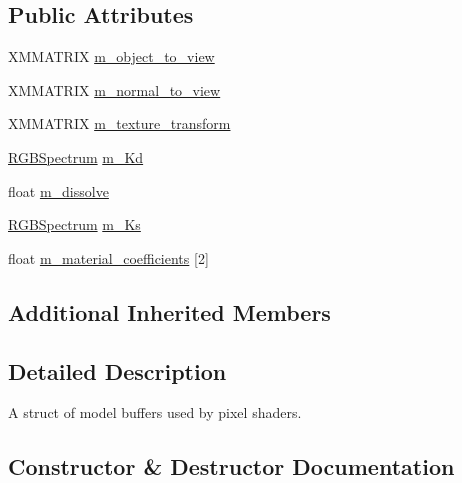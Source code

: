 \subsection*{Public Attributes}
\begin{DoxyCompactItemize}
\item 
X\+M\+M\+A\+T\+R\+IX \hyperlink{structmage_1_1_model_buffer_a2b4b94cd38c5d276aea4a7d6cc9edbba}{m\+\_\+object\+\_\+to\+\_\+view}
\item 
X\+M\+M\+A\+T\+R\+IX \hyperlink{structmage_1_1_model_buffer_ae9cfca57417c88d28362d979d6d37fa8}{m\+\_\+normal\+\_\+to\+\_\+view}
\item 
X\+M\+M\+A\+T\+R\+IX \hyperlink{structmage_1_1_model_buffer_a22d0996efc06c121ce2e0b88235d5650}{m\+\_\+texture\+\_\+transform}
\item 
\hyperlink{structmage_1_1_r_g_b_spectrum}{R\+G\+B\+Spectrum} \hyperlink{structmage_1_1_model_buffer_a3a0212d49721bc44c28f9ba1fbe38e1e}{m\+\_\+\+Kd}
\item 
float \hyperlink{structmage_1_1_model_buffer_a02ca2c0745b7687734c3c613a3d845cc}{m\+\_\+dissolve}
\item 
\hyperlink{structmage_1_1_r_g_b_spectrum}{R\+G\+B\+Spectrum} \hyperlink{structmage_1_1_model_buffer_a0f1c0dc40a4252b4a79bd2d9c30b3fca}{m\+\_\+\+Ks}
\item 
float \hyperlink{structmage_1_1_model_buffer_a2e3348c4bfd065cd692f2086c62297bf}{m\+\_\+material\+\_\+coefficients} \mbox{[}2\mbox{]}
\end{DoxyCompactItemize}
\subsection*{Additional Inherited Members}


\subsection{Detailed Description}
A struct of model buffers used by pixel shaders. 

\subsection{Constructor \& Destructor Documentation}
\hypertarget{structmage_1_1_model_buffer_a9069cfb6d75067b7f1509332fbec9be0}{}\label{structmage_1_1_model_buffer_a9069cfb6d75067b7f1509332fbec9be0} 
